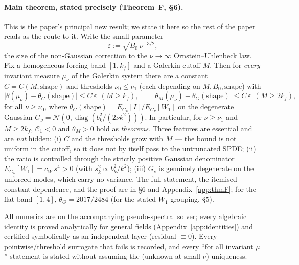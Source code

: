 \documentclass[11pt]{article}
\theoremstyle{remark}
\theoremstyle{plain}
\newcommand{\eqdef}{:=}
\begin{document}
\paragraph{Main theorem, stated precisely (Theorem~F, \S6).} This is the paper's principal new
result; we state it here so the rest of the paper reads as the route to it. Write the small
parameter
\begin{equation}\label{eq:eps}
   \varepsilon \eqdef \sqrt{B_0}\,\nu^{-3/2},
\end{equation}
the size of the non-Gaussian correction to the $\nu\to\infty$ Ornstein--Uhlenbeck law. Fix a
homogeneous forcing band $[1,k_f]$ and a Galerkin cutoff $M$. Then for \emph{every} invariant
measure $\mu_\nu$ of the Galerkin system there are a constant $C = C(M,\text{shape})$ and
thresholds $\nu_0 \le \nu_1$ (each depending on $M, B_0, \text{shape}$) with
\begin{equation}
   \bigl|\theta(\mu_\nu) - \theta_G(\text{shape})\bigr| \le C\,\varepsilon \ \ (M \ge k_f),
   \qquad
   \bigl|\theta_M(\mu_\nu) - \theta_G(\text{shape})\bigr| \le C\,\varepsilon \ \ (M \ge 2k_f),
\end{equation}
for all $\nu \ge \nu_0$, where $\theta_G(\text{shape}) = E_{G_\nu}[I]/E_{G_\nu}[W_1]$ on the
degenerate Gaussian $G_\nu = \mathcal{N}(0,\operatorname{diag}(b_k^2/(2\nu k^2)))$. In particular,
for $\nu \ge \nu_1$ and $M \ge 2k_f$, $\mathcal{C}_1 < 0$ and $\theta_M > 0$ hold as
\emph{theorems}. Three features are essential and are \emph{not} hidden: (i) $C$ and the thresholds grow with
$M$ --- the bound is not uniform in the cutoff, so it does not by itself pass to the untruncated
SPDE; (ii) the ratio is controlled through the strictly positive Gaussian denominator
$E_{G_\nu}[W_1] = c_W\,s^4 > 0$ (with $s_k^2 \propto b_k^2/k^2$); (iii) $G_\nu$ is genuinely
degenerate on the unforced modes, which carry no variance. The full statement, the itemised
constant-dependence, and the proof are in \S6 and Appendix~\ref{app:thmF}; for the flat band
$[1,4]$, $\theta_G = 2017/2484$ (for the stated $W_1$-grouping, \S5).

All numerics are on the accompanying pseudo-spectral solver; every algebraic identity
is proved analytically for general fields (Appendix~\ref{app:identities}) and certified
symbolically as an independent layer (residual $\equiv 0$). Every pointwise/threshold
surrogate that fails is recorded, and every ``for all invariant $\mu$'' statement is
stated without assuming the (unknown at small $\nu$) uniqueness.
\end{document}
